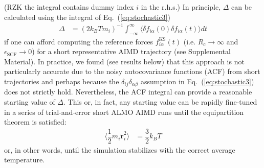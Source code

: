 \documentclass[aps,prl,reprint,amsmath,amssymb]{revtex4-1}
\begin{document}


(RZK the integral contains dummy index $i$ in the r.h.s.) In principle, $\Delta$ can be calculated using the integral of Eq.~(\ref{eq:stochastic3})
%
\begin{align}
\label{eq:delta}
\Delta &= (2 k_B T m_i )^{-1} \int_{-\infty}^{\infty}\langle \delta f_{i\alpha} (0)  \delta f_{i\alpha} (t) \rangle dt
\end{align}
%
if one can afford computing the reference forces $f^{\text{KS}}_{i\alpha}(t)$ (i.e. $R_c \rightarrow \infty$ and $\epsilon_{\text{SCF}} \rightarrow 0$) for a short representative AIMD trajectory (see Supplemental Material). 
In practice, we found (see results below) that this approach is not particularly accurate due to the noisy autocovariance functions (ACF) from short trajectories and perhaps because the $\delta_{ij}\delta_{\alpha\beta}$ assumption in Eq.~(\ref{eq:stochastic3}) does not strictly hold. 
Nevertheless, the ACF integral can provide a reasonable starting value of $\Delta$. 
This or, in fact, any starting value can be  rapidly fine-tuned in a series of trial-and-error short ALMO AIMD runs until the equipartition theorem is satisfied: 
%
\begin{align}
\label{eq:eqipartition}
\langle \dfrac{1}{2} m_i \dot{\bm{r}}^{2}_{i} \rangle &= \dfrac{3}{2} k_{B} T
\end{align}
%
or, in other words, until the simulation stabilizes with the correct average temperature.


\end{document}
